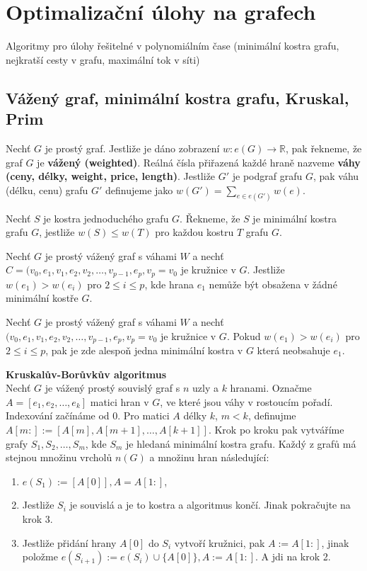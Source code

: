 \section{Optimalizační úlohy na grafech}
Algoritmy pro úlohy řešitelné v polynomiálním čase (minimální kostra grafu, nejkratší cesty v grafu, maximální tok v síti)
\subsection{Vážený graf, minimální kostra grafu, Kruskal, Prim}

\begin{definition}
Nechť $G$ je prostý graf. Jestliže je dáno zobrazení $w: e(G) \rightarrow \mathbb{R}$, pak řekneme, že graf $G$ je \textbf{vážený (weighted)}. Reálná čísla přiřazená každé hraně nazveme \textbf{váhy (ceny, délky, weight, price, length)}. Jestliže $G'$ je podgraf grafu $G$, pak váhu (délku, cenu) grafu $G'$ definujeme jako $w(G') = \sum_{e \in e(G')} w(e)$.
\end{definition}

\begin{definition}
Nechť $S$ je kostra jednoduchého grafu $G$. Řekneme, že $S$ je minimální kostra grafu $G$, jestliže $w(S) \leq w(T)$ pro každou kostru $T$ grafu $G$.
\end{definition}

\begin{theorem}
Nechť $G$ je prostý vážený graf s váhami $W$ a nechť $C = (v_0, e_1, v_1, e_2, v_2, \ldots, v_{p-1}, e_p, v_p = v_0$ je kružnice v $G$. Jestliže $w(e_1) > w(e_i)$ pro $2\leq i \leq p$, kde hrana $e_1$ nemůže být obsažena v žádné minimální kostře $G$.
\end{theorem}

\begin{theorem}
Nechť $G$ je prostý vážený graf s váhami $W$ a nechť $(v_0, e_1, v_1, e_2, v_2, \ldots, v_{p-1}, e_p, v_p = v_0$ je kružnice v $G$. Pokud $w(e_1) > w(e_i)$ pro $2\leq i \leq p$, pak je zde alespoň jedna minimální kostra v $G$ která neobsahuje $e_1$.
\end{theorem}
\textbf{Kruskalův-Borůvkův algoritmus}\\
Nechť $G$ je vážený prostý souvislý graf s $n$ uzly a $k$ hranami. Označme $A = [e_1, e_2, \ldots, e_k ]$ matici hran v $G$, ve které jsou váhy v rostoucím pořadí. Indexování začínáme od 0. Pro matici $A$ délky $k$, $m<k$, definujme $A[m:] := [A[m], A[m+1], \ldots, A[k+1]]$. Krok po kroku pak vytváříme grafy $S_1, S_2, \ldots, S_m$, kde $S_m$ je hledaná minimální kostra grafu. Každý z grafů má stejnou množinu vrcholů $n(G)$ a množinu hran následující:
\begin{enumerate}
    \item $e(S_1) := [A[0]], A = A[1:]$,
    \item Jestliže $S_i$ je souvislá a je to kostra a algoritmus končí. Jinak pokračujte na krok $3$.
    \item Jestliže přidání hrany $A[0]$ do $S_i$ vytvoří kružnici, pak $A := A[1:]$, jinak položme $e(S_{i+1}) := e(S_i) \cup \{ A[0] \}, A:= A[1:]$. A jdi na krok 2.
\end{enumerate}

